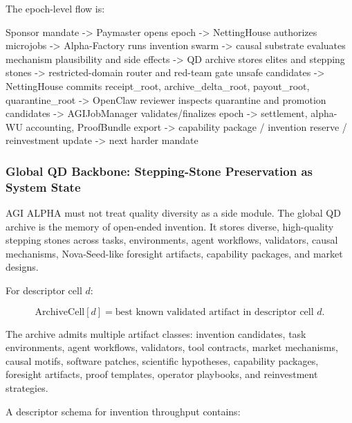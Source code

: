 \documentclass[
  11pt,
]{article}
\newenvironment{Shaded}{}{}
\newcommand{\NormalTok}[1]{#1}
\begin{document}
The epoch-level flow is:

\begin{Shaded}
\begin{Highlighting}[]
\NormalTok{Sponsor mandate}
\NormalTok{{-}\textgreater{} Paymaster opens epoch}
\NormalTok{{-}\textgreater{} NettingHouse authorizes microjobs}
\NormalTok{{-}\textgreater{} Alpha{-}Factory runs invention swarm}
\NormalTok{{-}\textgreater{} causal substrate evaluates mechanism plausibility and side effects}
\NormalTok{{-}\textgreater{} QD archive stores elites and stepping stones}
\NormalTok{{-}\textgreater{} restricted{-}domain router and red{-}team gate unsafe candidates}
\NormalTok{{-}\textgreater{} NettingHouse commits receipt\_root, archive\_delta\_root, payout\_root, quarantine\_root}
\NormalTok{{-}\textgreater{} OpenClaw reviewer inspects quarantine and promotion candidates}
\NormalTok{{-}\textgreater{} AGIJobManager validates/finalizes epoch}
\NormalTok{{-}\textgreater{} settlement, alpha{-}WU accounting, ProofBundle export}
\NormalTok{{-}\textgreater{} capability package / invention reserve / reinvestment update}
\NormalTok{{-}\textgreater{} next harder mandate}
\end{Highlighting}
\end{Shaded}

\subsubsection{Global QD Backbone: Stepping-Stone Preservation as System
State}\label{global-qd-backbone-stepping-stone-preservation-as-system-state}

AGI ALPHA must not treat quality diversity as a side module. The global
QD archive is the memory of open-ended invention. It stores diverse,
high-quality stepping stones across tasks, environments, agent
workflows, validators, causal mechanisms, Nova-Seed-like foresight
artifacts, capability packages, and market designs.

For descriptor cell \(d\):

\[
\mathrm{ArchiveCell}[d]
=
\text{best known validated artifact in descriptor cell } d.
\]

The archive admits multiple artifact classes: invention candidates, task
environments, agent workflows, validators, tool contracts, market
mechanisms, causal motifs, software patches, scientific hypotheses,
capability packages, foresight artifacts, proof templates, operator
playbooks, and reinvestment strategies.

A descriptor schema for invention throughput contains:
\end{document}
